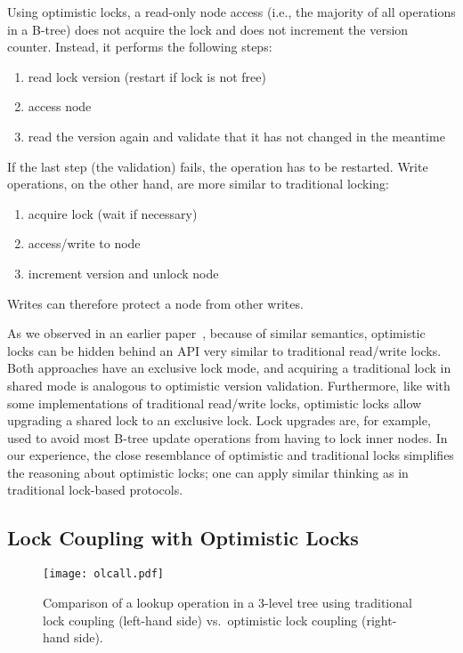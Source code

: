 \documentclass[11pt]{article}
\begin{document}
Using optimistic locks, a read-only node access (i.e., the majority of all operations in a B-tree) does not acquire the lock and does not increment the version counter.
Instead, it performs the following steps:
\begin{enumerate}
\item read lock version (restart if lock is not free)
\item access node
\item read the version again and validate that it has not changed in the meantime
\end{enumerate}
If the last step (the validation) fails, the operation has to be restarted.
Write operations, on the other hand, are more similar to traditional locking:
\begin{enumerate}
\item acquire lock (wait if necessary)
\item access/write to node
\item increment version and unlock node
\end{enumerate}
Writes can therefore protect a node from other writes.

As we observed in an earlier paper~\cite{artsync}, because of similar semantics, optimistic locks can be hidden behind an API very similar to traditional read/write locks.
Both approaches have an exclusive lock mode, and acquiring a traditional lock in shared mode is analogous to optimistic version validation.
Furthermore, like with some implementations of traditional read/write locks, optimistic locks allow upgrading a shared lock to an exclusive lock.
Lock upgrades are, for example, used to avoid most B-tree update operations from having to lock inner nodes.
In our experience, the close resemblance of optimistic and traditional locks simplifies the reasoning about optimistic locks;
one can apply similar thinking as in traditional lock-based protocols.

\subsection{Lock Coupling with Optimistic Locks}

\begin{figure}
  \centering
  \texttt{[image: olcall.pdf]}
  \vspace{0.2cm}
  \caption{Comparison of a lookup operation in a 3-level tree using traditional lock coupling (left-hand side) vs.~optimistic lock coupling (right-hand side).}
  \label{fig:olc}
\end{figure}
\end{document}
